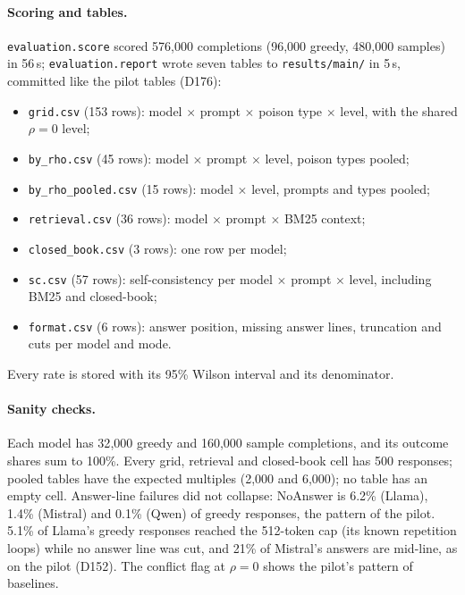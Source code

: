 \documentclass[11pt,a4paper]{report}
\begin{document}
\paragraph{Scoring and tables.} \texttt{evaluation.score} scored 576{,}000
completions (96{,}000 greedy, 480{,}000 samples) in 56\,s;
\texttt{evaluation.report} wrote seven tables to \texttt{results/main/} in
5\,s, committed like the pilot tables (D176):
\begin{itemize}[nosep]
  \item \texttt{grid.csv} (153 rows): model $\times$ prompt $\times$ poison type $\times$ level, with the shared $\rho=0$ level;
  \item \texttt{by\_rho.csv} (45 rows): model $\times$ prompt $\times$ level, poison types pooled;
  \item \texttt{by\_rho\_pooled.csv} (15 rows): model $\times$ level, prompts and types pooled;
  \item \texttt{retrieval.csv} (36 rows): model $\times$ prompt $\times$ BM25 context;
  \item \texttt{closed\_book.csv} (3 rows): one row per model;
  \item \texttt{sc.csv} (57 rows): self-consistency per model $\times$ prompt $\times$ level, including BM25 and closed-book;
  \item \texttt{format.csv} (6 rows): answer position, missing answer lines, truncation and cuts per model and mode.
\end{itemize}
Every rate is stored with its 95\% Wilson interval and its denominator.

\paragraph{Sanity checks.} Each model has 32{,}000 greedy and 160{,}000 sample
completions, and its outcome shares sum to 100\%. Every grid, retrieval and
closed-book cell has 500 responses; pooled tables have the expected multiples
(2{,}000 and 6{,}000); no table has an empty cell. Answer-line failures did not
collapse: NoAnswer is 6.2\% (Llama), 1.4\% (Mistral) and 0.1\% (Qwen) of
greedy responses, the pattern of the pilot. 5.1\% of Llama's greedy responses
reached the 512-token cap (its known repetition loops) while no answer line
was cut, and 21\% of Mistral's answers are mid-line, as on the pilot (D152).
The conflict flag at $\rho=0$ shows the pilot's pattern of baselines.
\end{document}
